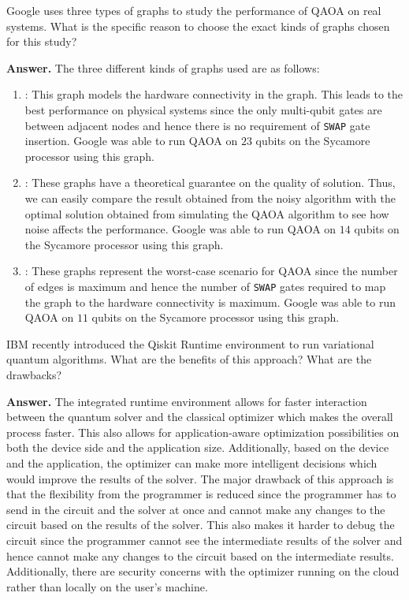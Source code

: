 \begin{question}
    Google uses three types of graphs to study the performance of QAOA on real systems. What is the specific reason to choose the exact kinds of graphs chosen for this study?
\end{question}
\textbf{Answer.} The three different kinds of graphs used are as follows:
\begin{enumerate}
    \item {}: This graph models the hardware connectivity in the graph. This leads to the best performance on physical systems since the only multi-qubit gates are between adjacent nodes and hence there is no requirement of \texttt{SWAP} gate insertion. Google was able to run QAOA on $23$ qubits on the Sycamore processor using this graph.
    \item {}: These graphs have a theoretical guarantee on the quality of solution. Thus, we can easily compare the result obtained from the noisy algorithm with the optimal solution obtained from simulating the QAOA algorithm to see how noise affects the performance. Google was able to run QAOA on $14$ qubits on the Sycamore processor using this graph.
    \item {}: These graphs represent the worst-case scenario for QAOA since the number of edges is maximum and hence the number of \texttt{SWAP} gates required to map the graph to the hardware connectivity is maximum. Google was able to run QAOA on $11$ qubits on the Sycamore processor using this graph.
\end{enumerate}

\tcbline{}

\begin{question}
    IBM recently introduced the Qiskit Runtime environment to run variational quantum algorithms. What are the benefits of this approach? What are the drawbacks?
\end{question}
\textbf{Answer.} The integrated runtime environment allows for faster interaction between the quantum solver and the classical optimizer which makes the overall process faster. This also allows for application-aware optimization possibilities on both the device side and the application size. Additionally, based on the device and the application, the optimizer can make more intelligent decisions which would improve the results of the solver. The major drawback of this approach is that the flexibility from the programmer is reduced since the programmer has to send in the circuit and the solver at once and cannot make any changes to the circuit based on the results of the solver. This also makes it harder to debug the circuit since the programmer cannot see the intermediate results of the solver and hence cannot make any changes to the circuit based on the intermediate results. Additionally, there are security concerns with the optimizer running on the cloud rather than locally on the user's machine.